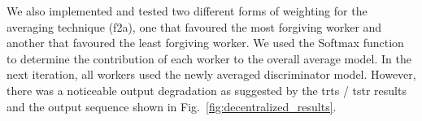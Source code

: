 We also implemented and tested two different forms of weighting for the averaging technique (\gls*{f2a}), one that favoured the most forgiving worker and another that favoured the least forgiving worker. We used the Softmax function to determine the contribution of each worker to the overall average model. In the next iteration, all workers used the newly averaged discriminator model. However, there was a noticeable output degradation as suggested by the \gls*{trts} / \gls*{tstr} results and the output sequence shown in Fig.~\ref{fig:decentralized_results}.
%

%

%
%



